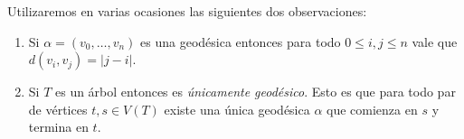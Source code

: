 \documentclass[tesis.tex]{subfiles}
\begin{document}
Utilizaremos en varias ocasiones las siguientes dos observaciones:

\begin{enumerate}[1-]
	\item Si $\alpha = (v_{0}, \dots, v_{n})$ es una geodésica entonces para todo $0 \le i,j \le n$ vale que  $d(v_{i}, v_{j}) = |j-i|$.
	\item Si $T$ es un árbol entonces es \emph{únicamente geodésico}.
	Esto es que para todo par de vértices $t,s \in V(T)$ existe una única geodésica $\alpha$ que comienza en $s$ y termina en $t$.
\end{enumerate}
\end{document}
